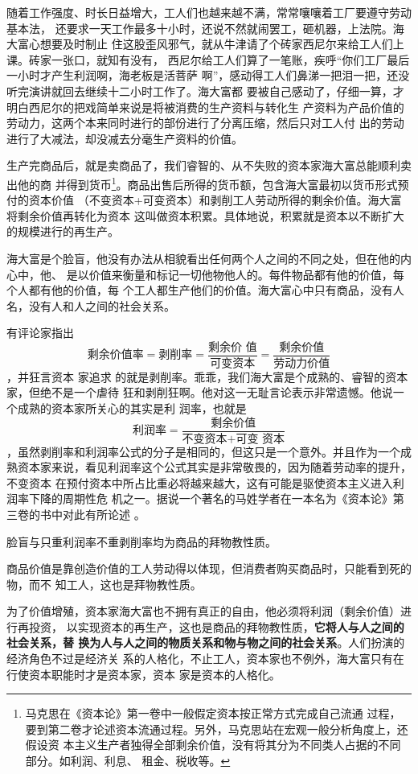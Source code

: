 随着工作强度、时长日益增大，工人们也越来越不满，常常嚷嚷着工厂要遵守劳动基本法，
还要求一天工作最多十小时，还说不然就闹罢工，砸机器，上法院。海大富心想要及时制止
住这股歪风邪气，就从牛津请了个砖家西尼尔来给工人们上课。砖家一张口，就知有没有，
西尼尔给工人们算了一笔账，疾呼“你们工厂最后一小时才产生利润啊，海老板是活菩萨
啊”，感动得工人们鼻涕一把泪一把，还没听完演讲就回去继续十二小时工作了。海大富都
要被自己感动了，仔细一算，才明白西尼尔的把戏简单来说是将被消费的生产资料与转化生
产资料为产品价值的劳动力，这两个本来同时进行的部份进行了分离压缩，然后只对工人付
出的劳动进行了大减法，却没减去分毫生产资料的价值。\bigskip


生产完商品后，就是卖商品了，我们睿智的、从不失败的资本家海大富总能顺利卖出他的商
并得到货币\footnote{马克思在《资本论》第一卷中一般假定资本按正常方式完成自己流通
过程，要到第二卷才论述资本流通过程。另外，马克思站在宏观一般分析角度上，还假设资
本主义生产者独得全部剩余价值，没有将其分为不同类人占据的不同部分。如利润、利息、
租金、税收等。}。商品出售后所得的货币额，包含海大富最初以货币形式预付的资本价值
（不变资本+可变资本）和剥削工人劳动所得的剩余价值。海大富将剩余价值再转化为资本
这叫做资本积累。具体地说，积累就是资本以不断扩大的规模进行的再生产。 \bigskip

海大富是个脸盲，他没有办法从相貌看出任何两个人之间的不同之处，但在他的内心中，他、
是以价值来衡量和标记一切他物他人的。每件物品都有他的价值，每个人都有他的价值，每
个工人都生产他们的价值。海大富心中只有商品，没有人名，没有人和人之间的社会关系。

有评论家指出\[\mbox{剩余价值率} = \mbox{剥削率} = \frac{\mbox{剩余价
值}}{\mbox{可变资本}} = \frac{\mbox{剩余价值}}{\mbox{劳动力价值}}\]，并狂言资本
家追求 的就是剥削率。乖乖，我们海大富是个成熟的、睿智的资本家，但绝不是一个虐待
狂和剥削狂啊。他对这一无耻言论表示非常遗憾。他说一个成熟的资本家所关心的其实是利
润率，也就是\[\mbox{利润率} = \frac{\mbox{剩余价值}}{\mbox{不变资本}+\mbox{可变
资本}}\]，虽然剥削率和利润率公式的分子是相同的，但这只是一个意外。并且作为一个成
熟资本家来说，看见利润率这个公式其实是非常敬畏的，因为随着劳动率的提升，不变资本
在预付资本中所占比重必将越来越大，这有可能是驱使资本主义进入利润率下降的周期性危
机之一。据说一个著名的马姓学者在一本名为《资本论》第三卷的书中对此有所论述
。

脸盲与只重利润率不重剥削率均为商品的拜物教性质。

商品价值是靠创造价值的工人劳动得以体现，但消费者购买商品时，只能看到死的物，而不
知工人，这也是拜物教性质。

为了价值增殖，资本家海大富也不拥有真正的自由，他必须将利润（剩余价值）进行再投资，
以实现资本的再生产，这也是商品的拜物教性质，\textbf{它将人与人之间的社会关系，替
换为人与人之间的物质关系和物与物之间的社会关系}。人们扮演的经济角色不过是经济关
系的人格化，不止工人，资本家也不例外，海大富只有在行使资本职能时才是资本家，资本
家是资本的人格化。 \bigskip

